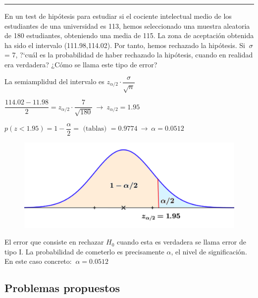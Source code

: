\begin{flushright}\rule{300pt}{0.1pt}\end{flushright}


\vspace{4mm}
\begin{ejemplo}
\begin{ejre}
	En un test de hipótesis para estudiar si el cociente intelectual medio de los estudiantes de una universidad es 113, hemos seleccionado una muestra aleatoria de 180 estudiantes, obteniendo una media de 115. La zona de aceptación obtenida ha sido el intervalo (111.98,114.02). Por tanto, hemos rechazado la hipótesis. Si $\ \sigma$ = 7, ?`cuál es la probabilidad de haber rechazado la hipótesis, cuando en realidad era verdadera? ¿Cómo se llama este tipo de error?
\end{ejre}
\end{ejemplo}

\begin{multicols}{2}
	
La semiamplidud del intervalo es $z_{\alpha/2}\cdot \dfrac{\sigma}{\sqrt{n}}$

$\dfrac{114.02-11.98}{2}=z_{\alpha/2} \cdot \dfrac{7}{\sqrt{180}} \ \to \ 
z_{\alpha/2}=1.95$

$p(z<1.95)=1-\dfrac \alpha 2=\text{ (tablas) } =0.9774 \ \to \ \alpha=0.0512$

\begin{figure}[H]
	\centering
	\includegraphics[width=.45\textwidth]{imagenes/imagenes06/T06IM09.png}
	\end{figure}

\end{multicols}
El error que consiste en rechazar $H_0$ cuando esta es verdadera se llama error de tipo I. La probabilidad de cometerlo es precisamente $\alpha$, el nivel de significación. En este caso concreto: $\ \alpha=0.0512$






\subsection{Problemas propuestos}


